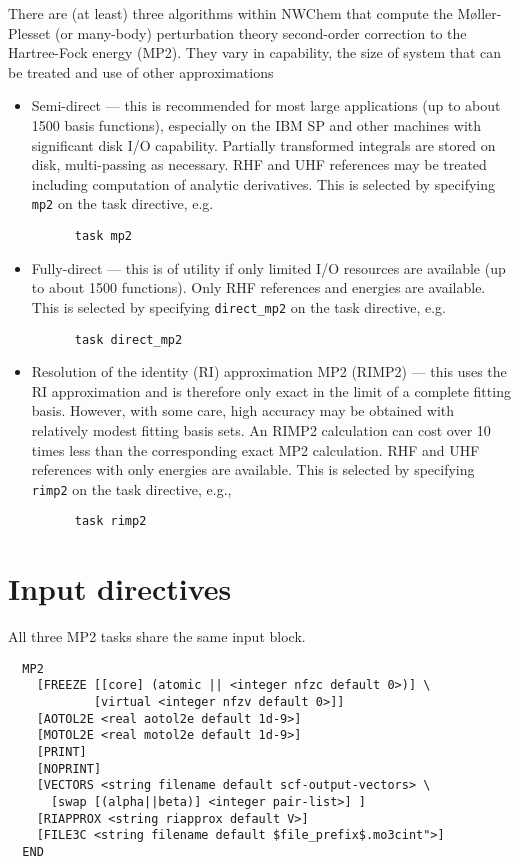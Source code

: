 \label{sec:mp2}
\label{sec:rimp2}

There are (at least) three algorithms within NWChem that compute the
M{\o}ller-Plesset (or many-body) perturbation theory second-order
correction to the Hartree-Fock energy (MP2).  They vary in capability,
the size of system that can be treated and use of other approximations
\begin{itemize}
\item Semi-direct --- this is recommended for most large applications
  (up to about 1500 basis functions), especially on the IBM SP and
  other machines with significant disk I/O capability.  Partially
  transformed integrals are stored on disk, multi-passing as necessary.
  RHF and UHF references may be treated including computation of
  analytic derivatives.  This is selected by specifying \verb+mp2+ on
  the task directive, e.g.
\begin{verbatim}
      task mp2
\end{verbatim}
\item Fully-direct --- this is of utility if only limited I/O
  resources are available (up to about 1500 functions).  Only RHF
  references and energies are available. This is selected by
  specifying \verb+direct_mp2+ on the task directive, e.g.
\begin{verbatim}
      task direct_mp2
\end{verbatim}
\item Resolution of the identity (RI) approximation MP2 (RIMP2) ---
  this uses the RI approximation and is therefore only exact in the
  limit of a complete fitting basis.  However, with some care, high
  accuracy may be obtained with relatively modest fitting basis sets.
  An RIMP2 calculation can cost over 10 times less than the
  corresponding exact MP2 calculation.  RHF and UHF references with
  only energies are available.  This is selected by specifying
  \verb+rimp2+ on the task directive, e.g.,
\begin{verbatim}
      task rimp2
\end{verbatim}
\end{itemize}

\section{Input directives}

All three MP2 tasks share the same input block.

\begin{verbatim}
  MP2
    [FREEZE [[core] (atomic || <integer nfzc default 0>)] \
            [virtual <integer nfzv default 0>]]
    [AOTOL2E <real aotol2e default 1d-9>]
    [MOTOL2E <real motol2e default 1d-9>]
    [PRINT]
    [NOPRINT]
    [VECTORS <string filename default scf-output-vectors> \
      [swap [(alpha||beta)] <integer pair-list>] ]
    [RIAPPROX <string riapprox default V>]
    [FILE3C <string filename default $file_prefix$.mo3cint">]
  END
\end{verbatim}

